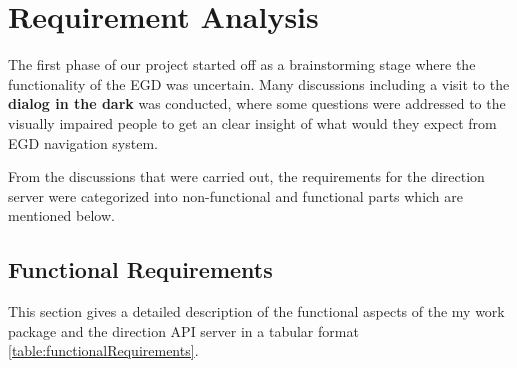 \newpage
\chapter{Requirement Analysis}
    The first phase of our project started off as a brainstorming stage where the functionality
    of the EGD was uncertain. Many discussions including a visit to the \textbf{dialog in the dark} 
    was conducted, where some questions were addressed to the visually impaired people to get an clear insight
    of what would they expect from EGD navigation system. 
\par
    From the discussions that were carried out, the requirements for the direction server were
    categorized into non-functional and functional parts which are mentioned below.
    
    \section{Functional Requirements}
        This section gives a detailed description of the functional aspects of the my work package %
        and the direction API server in a tabular format \ref{table:functionalRequirements}.
